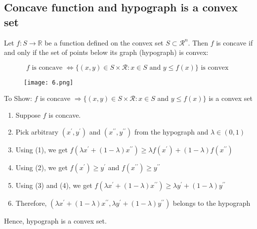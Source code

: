 \documentclass[12pt,a4paper]{article}
\begin{document}
\subsection{Concave function and hypograph is a convex set} 
Let \(f: S \rightarrow \mathbb{R}\) be a function defined on the convex set \(S \subset \mathcal{R}^n\). Then \(f\) is concave if and only if the set of points below its graph (hypograph) is convex:
\begin{tcolorbox}
    \begin{equation*}
        f \text{ is concave } \Leftrightarrow \{(x,y) \in S \times \mathcal{R} : x \in S \text{ and } y \leq f(x)\} \text{ is convex }
    \end{equation*} 
\end{tcolorbox}   
\begin{figure}[H]
    \centering
    \texttt{[image: 6.png]}
\end{figure}
To Show: \(f\) is concave
\(\Longrightarrow\{(x, y) \in S \times \mathcal{R}: x \in S\) and \(y \leq f(x)\}\)
is a convex set
\begin{enumerate}
    \item Suppose \(f\) is concave.
    \item Pick arbitrary \(\left(x^{\prime}, y^{\prime}\right)\) and \(\left(x^{\prime \prime}, y^{\prime \prime}\right)\) from the hypograph and \(\lambda \in(0,1)\)
    \item Using (1), we get \(f\left(\lambda x^{\prime}+(1-\lambda) x^{\prime \prime}\right) \geq \lambda f\left(x^{\prime}\right)+(1-\lambda) f\left(x^{\prime \prime}\right)\)
    \item Using (2), we get \(f\left(x^{\prime}\right) \geq y^{\prime}\) and \(f\left(x^{\prime \prime}\right) \geq y^{\prime \prime}\)
    \item Using (3) and (4), we get \(f\left(\lambda x^{\prime}+(1-\lambda) x^{\prime \prime}\right) \geq \lambda y^{\prime}+(1-\lambda) y^{\prime \prime}\)
    \item Therefore, \(\left(\lambda x^{\prime}+(1-\lambda) x^{\prime \prime}, \lambda y^{\prime}+(1-\lambda) y^{\prime \prime}\right)\) belongs to the hypograph
\end{enumerate}
    
Hence, hypograph is a convex set.
\end{document}
